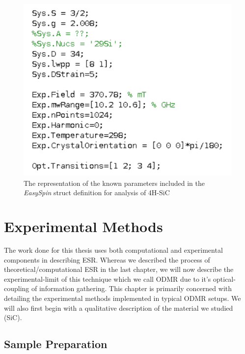 \documentclass[oneside, astronomy, noacknowlegments]{BYUPhys}
\begin{document}
\begin{figure}
    \centerline{\includegraphics{sic_params_commented_fig}}
    \caption[The \textit{EasySpin} representation of SiC]{\label{fig:SiCParams}
     The representation of the known parameters included in the \textit{EasySpin} struct definition for analysis of 4H-SiC}
 \end{figure}
 










\chapter{Experimental Methods}

The work done for this thesis uses both computational and experimental components in describing ESR. Whereas we described the process of theoretical/computational ESR in the last chapter, we will now describe the experimental-limit of this technique which we call ODMR due to it's optical-coupling of information gathering. This chapter is primarily concerned with detailing the experimental methods implemented in typical ODMR setups. We will also first begin with a qualitative description of the material we studied (SiC).

\section{Sample Preparation}
\end{document}
